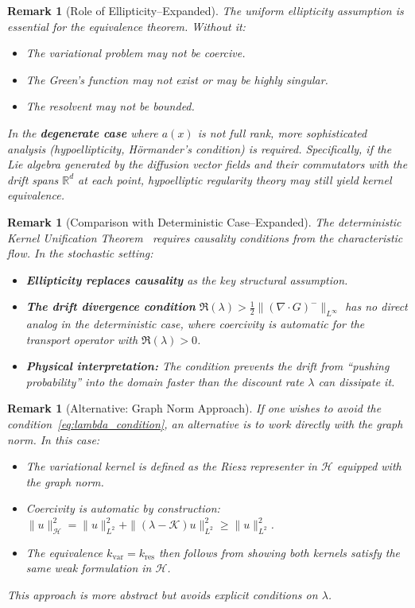\documentclass[11pt,a4paper]{article}
\newtheorem{remark}[theorem]{Remark}
\newcommand{\R}{\mathbb{R}}
\newcommand{\Koop}{\mathcal{K}}
\begin{document}
\begin{remark}[Role of Ellipticity--Expanded]
The uniform ellipticity assumption is essential for the equivalence theorem. Without it:
\begin{itemize}
\item The variational problem may not be coercive.
\item The Green's function may not exist or may be highly singular.
\item The resolvent may not be bounded.
\end{itemize}
In the \textbf{degenerate case} where $a(x)$ is not full rank, more sophisticated analysis (hypoellipticity, H\"{o}rmander's condition) is required. Specifically, if the Lie algebra generated by the diffusion vector fields and their commutators with the drift spans $\R^d$ at each point, hypoelliptic regularity theory may still yield kernel equivalence.
\end{remark}

\begin{remark}[Comparison with Deterministic Case--Expanded]
The deterministic Kernel Unification Theorem~\cite[Theorem 3.7]{HamziOwhadiVaidya2024} requires causality conditions from the characteristic flow. In the stochastic setting:
\begin{itemize}
\item \textbf{Ellipticity replaces causality} as the key structural assumption.
\item \textbf{The drift divergence condition} $\Re(\lambda) > \frac{1}{2}\|(\nabla \cdot G)^-\|_{L^\infty}$ has no direct analog in the deterministic case, where coercivity is automatic for the transport operator with $\Re(\lambda) > 0$.
\item \textbf{Physical interpretation:} The condition prevents the drift from ``pushing probability'' into the domain faster than the discount rate $\lambda$ can dissipate it.
\end{itemize}
\end{remark}

\begin{remark}[Alternative: Graph Norm Approach]\label{rem:graph_norm}
If one wishes to avoid the condition~\eqref{eq:lambda_condition}, an alternative is to work directly with the graph norm. In this case:
\begin{itemize}
\item The variational kernel is defined as the Riesz representer in $\mathcal{H}$ equipped with the graph norm.
\item Coercivity is automatic by construction: $\|u\|_{\mathcal{H}}^2 = \|u\|_{L^2}^2 + \|(\lambda - \Koop)u\|_{L^2}^2 \geq \|u\|_{L^2}^2$.
\item The equivalence $k_{\mathrm{var}} = k_{\mathrm{res}}$ then follows from showing both kernels satisfy the same weak formulation in $\mathcal{H}$.
\end{itemize}
This approach is more abstract but avoids explicit conditions on $\lambda$.
\end{remark}
\end{document}
